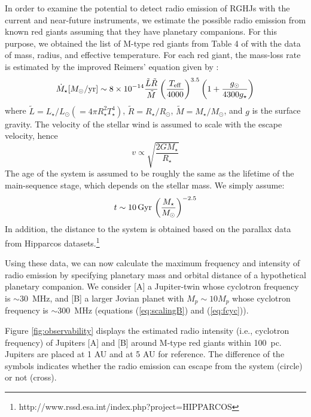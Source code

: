\documentclass[iop,numberedappendix,apj]{emulateapj}
\begin{document}
In order to examine the potential to detect radio emission of RGHJs with the current and near-future instruments, we estimate the possible radio emission from known red giants assuming that they have planetary companions. 
For this purpose, we obtained the list of M-type red giants from Table 4 of \citet{dumm1998} with the data of mass, radius, and effective temperature.
For each red giant, the mass-loss rate is estimated by the improved Reimers' equation \citep{reimers1975} given by \citet{schroder2005,schroder2007}:
\begin{equation}
\dot M_\star [M_\odot{\rm /yr}] \sim 8 \times 10^{-14} \frac{\tilde L \tilde R}{\tilde M} \left( \frac{T_{\rm eff}}{4000} \right)^{3.5} \left( 1 + \frac{g_{\odot }}{4300 g_{\star}} \right) 
\end{equation}
where $\tilde L = L_{\star }/L_{\odot }(=4\pi R_{\star }^2 T_{\star }^4)$, $\tilde R = R_{\star }/R_{\odot }$, $\tilde M = M_{\star }/M_{\odot }$, and $g$ is the surface gravity. 
The velocity of the stellar wind is assumed to scale with the escape velocity, hence
\begin{equation}
v \propto \sqrt{\frac{2GM_\star}{R_{\star }}}
\end{equation}
The age of the system is assumed to be roughly the same as the lifetime of the main-sequence stage, which depends on the stellar mass. We simply assume:
\begin{equation}
t \sim 10\,{\rm Gyr}\, \left( \frac{M_{\star}}{M_{\odot }} \right)^{-2.5}
\end{equation}
In addition, the distance to the system is obtained based on the parallax data from Hipparcos datasets.\footnote{http://www.rssd.esa.int/index.php?project=HIPPARCOS}

Using these data, we can now calculate the maximum frequency and intensity of radio emission by specifying planetary mass and orbital distance of a hypothetical planetary companion. 
We consider [A] a Jupiter-twin whose cyclotron frequency is $\sim 30$~MHz, and [B] a larger Jovian planet with $M_p\sim 10M_p$ whose cyclotron frequency is $\sim 300$~MHz (equations (\ref{eq:scalingB}) and (\ref{eq:fcyc})). 

Figure \ref{fig:observability} displays the estimated radio intensity (i.e., cyclotron frequency) of Jupiters [A] and [B] around M-type red giants within 100~pc. 
Jupiters are placed at 1 AU and at 5 AU for reference. 
The difference of the symbols indicates whether the radio emission can escape from the system (circle) or not (cross). 
\end{document}
